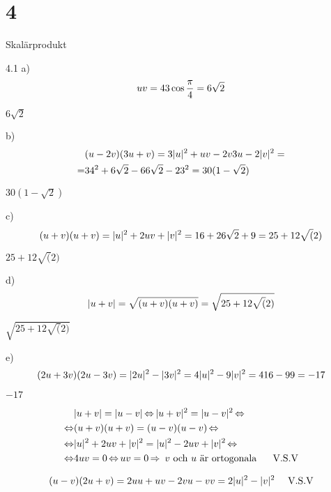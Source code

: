 \chapter{4}{Skalärprodukt}
\begin{task}{4.1 a)}
	\[u\*v=4\*3\*\cos\frac{\pi}{4}=6\sqrt{2}\]

	\ans $6\sqrt{2}$
\end{task}

\begin{task}{b)}
	\begin{align*}
		&(u-2v)\*(3u+v)=
		3|u|^2+u\*v-2v\*3u-2|v|^2= \\ =
		&3\*4^2+6\sqrt{2}-6\*6\sqrt{2}-2\*3^2=
		30(1-\sqrt{2})
	\end{align*}

	\ans $30(1-\sqrt{2})$
\end{task}

\begin{task}{c)}
	\[(u+v)\*(u+v)=
	|u|^2+2u\*v+|v|^2=
	16+2\*6\sqrt{2}+9=
	25+12\sqrt(2)\]

	\ans $25+12\sqrt(2)$
\end{task}

\begin{task}{d)}
	\[|u+v|=\sqrt{(u+v)\*(u+v)}=\sqrt{25+12\sqrt(2)}\]

	\ans $\sqrt{25+12\sqrt(2)}$
\end{task}

\begin{task}{e)}
	\[(2u+3v)\*(2u-3v)=|2u|^2-|3v|^2=4|u|^2-9|v|^2=4\*16-9\*9=-17\]

	\ans $-17$
\end{task}

\begin{task}{4.2}
	\begin{align*}
		&|u+v|=|u-v| \lra
		|u+v|^2=|u-v|^2 \lra \\ \lra
		&(u+v)\*(u+v)=(u-v)\*(u-v) \lra \\ \lra
		&|u|^2+2u\*v+|v|^2=|u|^2-2u\*v+|v|^2 \lra \\ \lra
		&4u\*v=0 \lra
		u\*v=0 \ra
		\text{ $v$ och $u$ är ortogonala \proof}
	\end{align*}
	
	\ans
\end{task}

\begin{task}{4.3}
	\[(u-v)\*(2u+v)=
	2u\*u+u\*v-2v\*u-v\*v=
	2|u|^2-|v|^2 \mproof\]
\end{task}

